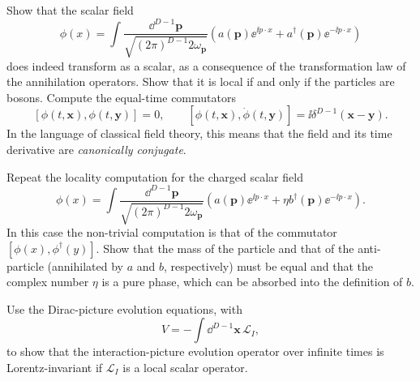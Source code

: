 \begin{banksproblems}
Show that the scalar field
\[
  \phi(x)=\int\frac{\dd^{D-1}\mathbf p}{\sqrt{(2\pi)^{D-1}2\omega_{\mathbf p}}}
  \left(a(\mathbf p)\ee^{\ii p\mathbin{\cdot}x}+a^{\dagger}(\mathbf p)\ee^{-\ii p\mathbin{\cdot}x}\right)
\]
does indeed transform as a scalar, as a consequence of the transformation law of the annihilation operators. Show that it is local if and only if the particles are bosons. Compute the equal-time commutators
\[
  [\phi(t,\mathbf{x}),\phi(t,\mathbf{y})]=0,
  \qquad
  [\phi(t,\mathbf{x}),\dot\phi(t,\mathbf{y})]=\ii\delta^{D-1}(\mathbf{x}-\mathbf{y}).
\]
In the language of classical field theory, this means that the field and its time derivative are \emph{canonically conjugate}.

Repeat the locality computation for the charged scalar field
\[
  \phi(x)=\int\frac{\dd^{D-1}\mathbf p}{\sqrt{(2\pi)^{D-1}2\omega_{\mathbf p}}}
  \left(a(\mathbf p)\ee^{\ii p\mathbin{\cdot}x}+\eta b^{\dagger}(\mathbf p)\ee^{-\ii p\mathbin{\cdot}x}\right).
\]
In this case the non-trivial computation is that of the commutator $[\phi(x),\phi^{\dagger}(y)]$. Show that the mass of the particle and that of the anti-particle (annihilated by $a$ and $b$, respectively) must be equal and that the complex number $\eta$ is a pure phase, which can be absorbed into the definition of $b$.

Use the Dirac-picture evolution equations, with
\[
  V=-\int\dd^{D-1}\mathbf x\,\mathcal{L}_{I},
\]
to show that the interaction-picture evolution operator over infinite times is Lorentz-invariant if $\mathcal{L}_{I}$ is a local scalar operator.


\end{banksproblems}
